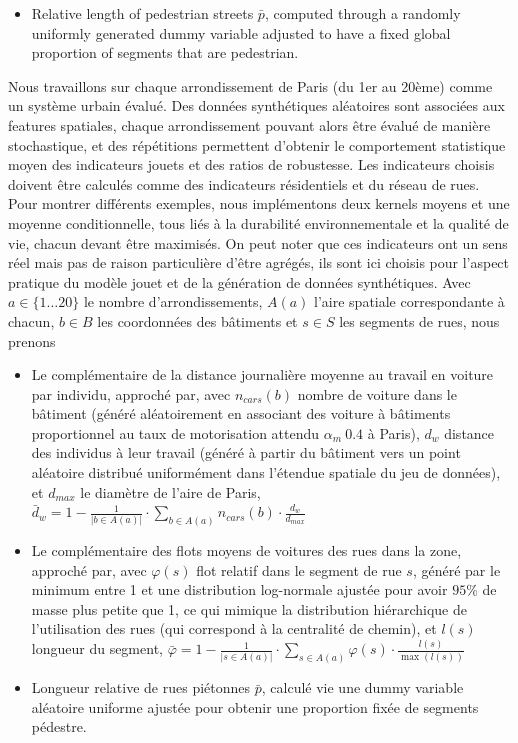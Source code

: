 {\begin{itemize}
\item Relative length of pedestrian streets $\bar{p}$, computed through a randomly uniformly generated dummy variable adjusted to have a fixed global proportion of segments that are pedestrian.
\end{itemize}
}{
Nous travaillons sur chaque arrondissement de Paris (du 1er au 20ème) comme un système urbain évalué. Des données synthétiques aléatoires sont associées aux features spatiales, chaque arrondissement pouvant alors être évalué de manière stochastique, et des répétitions permettent d'obtenir le comportement statistique moyen des indicateurs jouets et des ratios de robustesse. Les indicateurs choisis doivent être calculés comme des indicateurs résidentiels et du réseau de rues. Pour montrer différents exemples, nous implémentons deux kernels moyens et une moyenne conditionnelle, tous liés à la durabilité environnementale et la qualité de vie, chacun devant être maximisés. On peut noter que ces indicateurs ont un sens réel mais pas de raison particulière d'être agrégés, ils sont ici choisis pour l'aspect pratique du modèle jouet et de la génération de données synthétiques. Avec $a\in \{1\ldots 20\}$ le nombre d'arrondissements, $A(a)$ l'aire spatiale correspondante à chacun, $b\in B$ les coordonnées des bâtiments et $s\in S$ les segments de rues, nous prenons

\begin{itemize}
\item Le complémentaire de la distance journalière moyenne au travail en voiture par individu, approché par, avec $n_{cars}(b)$ nombre de voiture dans le bâtiment (généré aléatoirement en associant des voiture à bâtiments proportionnel au taux de motorisation attendu $\alpha_m ~ 0.4$ à Paris), $d_w$ distance des individus à leur travail (généré à partir du bâtiment vers un point aléatoire distribué uniformément dans l'étendue spatiale du jeu de données), et $d_{max}$ le diamètre de l'aire de Paris, $\bar{d}_w = 1 - \frac{1}{|b\in A(a)|} \cdot \sum_{b\in A(a)}{n_{cars}(b)\cdot \frac{d_w}{d_{max}}}$
\item Le complémentaire des flots moyens de voitures des rues dans la zone, approché par, avec $\varphi(s)$ flot relatif dans le segment de rue $s$, généré par le minimum entre 1 et une distribution log-normale ajustée pour avoir $95\%$ de masse plus petite que 1, ce qui mimique la distribution hiérarchique de l'utilisation des rues (qui correspond à la centralité de chemin), et $l(s)$ longueur du segment, $\bar{\varphi} = 1 - \frac{1}{|s\in A(a)|} \cdot \sum_{s \in A(a)}{\varphi(s)\cdot \frac{l(s)}{\max{(l(s))}}}$
\item Longueur relative de rues piétonnes $\bar{p}$, calculé vie une dummy variable aléatoire uniforme ajustée pour obtenir une proportion fixée de segments pédestre.
\end{itemize}
}




